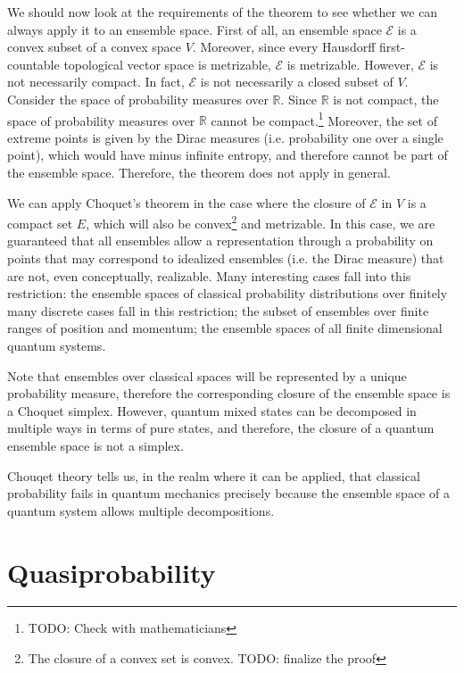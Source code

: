 \documentclass[10pt,twocolumn, nofootinbib]{revtex4-2}
\newcommand{\Ens}[1][E] {\mathcal{#1}} %
\begin{document}
We should now look at the requirements of the theorem to see whether we can always apply it to an ensemble space. First of all, an ensemble space $\Ens$ is a convex subset of a convex space $V$. Moreover, since every Hausdorff first-countable topological vector space is metrizable, $\Ens$ is metrizable. However, $\Ens$ is not necessarily compact. In fact, $\Ens$ is not necessarily a closed subset of $V$. Consider the space of probability measures over $\mathbb{R}$. Since $\mathbb{R}$ is not compact, the space of probability measures over $\mathbb{R}$ cannot be compact.\footnote{TODO: Check with mathematicians} Moreover, the set of extreme points is given by the Dirac measures (i.e. probability one over a single point), which would have minus infinite entropy, and therefore cannot be part of the ensemble space. Therefore, the theorem does not apply in general.

We can apply Choquet's theorem in the case where the closure of $\Ens$ in $V$ is a compact set $E$, which will also be convex\footnote{The closure of a convex set is convex. TODO: finalize the proof} and metrizable. In this case, we are guaranteed that all ensembles allow a representation through a probability on points that may correspond to idealized ensembles (i.e. the Dirac measure) that are not, even conceptually, realizable. Many interesting cases fall into this restriction: the ensemble spaces of classical probability distributions over finitely many discrete cases fall in this restriction; the subset of ensembles over finite ranges of position and momentum; the ensemble spaces of all finite dimensional quantum systems.

Note that ensembles over classical spaces will be represented by a unique probability measure, therefore the corresponding closure of the ensemble space is a Choquet simplex. However, quantum mixed states can be decomposed in multiple ways in terms of pure states, and therefore, the closure of a quantum ensemble space is not a simplex.


Chouqet theory tells us, in the realm where it can be applied, that classical probability fails in quantum mechanics precisely because the ensemble space of a quantum system allows multiple decompositions.

\section{Quasiprobability}
\end{document}
